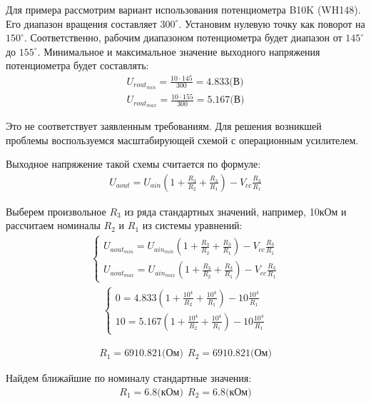 Для примера рассмотрим вариант использования потенциометра B10K (WH148).
Его диапазон вращения составляет $300^\circ$.
Установим нулевую точку как поворот на $150^\circ$.
Соответственно, рабочим диапазоном потенциометра будет диапазон от $145^\circ$до $155^\circ$.
Минимальное и максимальное значение выходного напряжения потенциометра будет составлять:
\begin{gather*}
    U_{rout_{min}} = \frac{10\cdot145}{300}= 4.833\text{(В)}\\
    U_{rout_{max}} = \frac{10\cdot155}{300}= 5.167\text{(В)}
\end{gather*}

Это не соответствует заявленным требованиям.
Для решения возникшей проблемы воспользуемся масштабирующей схемой с операционным усилителем.

Выходное напряжение такой схемы считается по формуле:
\begin{gather*}
    U_{aout} = U_{ain}(1 + \frac{R_3}{R_2} + \frac{R_3}{R_1})-V_{cc}\frac{R_3}{R_1}
\end{gather*}

Выберем произвольное $R_3$ из ряда стандартных значений, например, 10кОм и рассчитаем номиналы $R_2$ и $R_1$ из системы уравнений:
\begin{gather*}
    \begin{cases}
        U_{aout_{min}} = U_{ain_{min}}(1 + \frac{R_3}{R_2} + \frac{R_3}{R_1})-V_{cc}\frac{R_3}{R_1}\\
        U_{aout_{max}} = U_{ain_{max}}(1 + \frac{R_3}{R_2} + \frac{R_3}{R_1})-V_{cc}\frac{R_3}{R_1}
    \end{cases}
\end{gather*}
\begin{gather*}
    \begin{cases}
        0 = 4.833(1 + \frac{10^4}{R_2} + \frac{10^4}{R_1})-10\frac{10^4}{R_1}\\
        10 = 5.167(1 + \frac{10^4}{R_2} + \frac{10^4}{R_1})-10\frac{10^4}{R_1}
    \end{cases}
\end{gather*}

\begin{gather*}
        R_1 = 6910.821\text{(Ом)}\ \
        R_2 = 6910.821\text{(Ом)}
\end{gather*}

Найдем ближайшие по номиналу стандартные значения:
\begin{gather*}
    R_1 = 6.8\text{(кОм)}\ \
    R_2 = 6.8\text{(кОм)}
\end{gather*}

